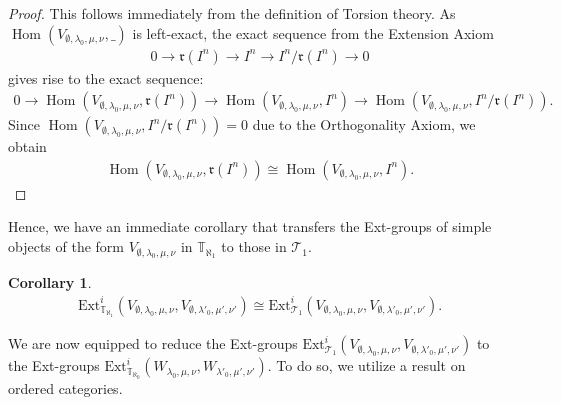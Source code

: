 \documentclass[openany, a4paper]{amsbook}
\newtheorem{cor}[thm]{Corollary}
\theoremstyle{definition}
\numberwithin{equation}{chapter}
\newcommand{\T}[1]{{\mathbb{T}}_{\aleph_{#1}}}
\DeclareMathOperator{\Hom}{\mathrm{Hom}}
\newcommand{\Ext}[4]{\mathrm{Ext}^{#1}_{#2}({#3}, {#4})}
\begin{document}
\begin{proof}
    This follows immediately from the definition of Torsion theory. As $\Hom(V_{\emptyset, \lambda_0, \mu, \nu}, \_)$ is left-exact, the exact sequence from the Extension Axiom
    \begin{align*}
        0 \longrightarrow \mathfrak{r}(I^n) \longrightarrow I^n \longrightarrow I^n/\mathfrak{r}(I^n) \longrightarrow 0
    \end{align*}
    gives rise to the exact sequence:
    \begin{align*}
        0 \longrightarrow \Hom(V_{\emptyset, \lambda_0, \mu, \nu},\mathfrak{r}(I^n)) \longrightarrow \Hom(V_{\emptyset, \lambda_0, \mu, \nu}, I^n) \longrightarrow \Hom(V_{\emptyset, \lambda_0, \mu, \nu}, I^n/\mathfrak{r}(I^n)).
    \end{align*}
    Since $\Hom(V_{\emptyset, \lambda_0, \mu, \nu}, I^n/\mathfrak{r}(I^n)) = 0$ due to the Orthogonality Axiom, we obtain 
    \begin{align*}
        \Hom(V_{\emptyset, \lambda_0, \mu, \nu},\mathfrak{r}(I^n)) \cong \Hom(V_{\emptyset, \lambda_0, \mu, \nu}, I^n).    
    \end{align*}
\end{proof}

Hence, we have an immediate corollary that transfers the Ext-groups of simple objects of the form $V_{\emptyset, \lambda_0, \mu, \nu}$ in $\T{1}$ to those in $\mathcal{T}_1$.

\begin{cor}
    \begin{align}\label{Ext RV}
        \Ext{i}{\T{1}}{V_{\emptyset, \lambda_0, \mu, \nu}}{V_{\emptyset, \lambda'_0, \mu', \nu'}} \cong \Ext{i}{\mathcal{T}_1}{V_{\emptyset, \lambda_0, \mu, \nu}}{V_{\emptyset, \lambda'_0, \mu', \nu'}}.
    \end{align}
\end{cor}

We are now equipped to reduce the Ext-groups $\Ext{i}{\mathcal{T}_1}{V_{\emptyset, \lambda_0, \mu, \nu}}{V_{\emptyset, \lambda'_0, \mu', \nu'}}$ to the Ext-groups $\Ext{i}{\T{0}}{W_{\lambda_0, \mu, \nu}}{W_{\lambda'_0, \mu', \nu'}}$. To do so, we utilize a result on ordered categories.
\end{document}
